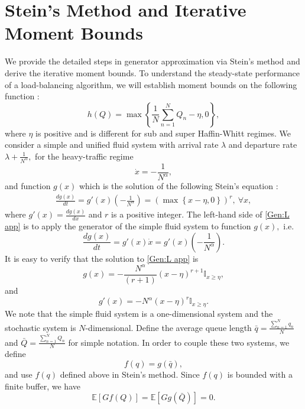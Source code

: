 \documentclass[11pt,oneside,letter]{article}
\begin{document}
\section{Stein's Method and Iterative Moment Bounds}\label{app:stein}
We provide the detailed steps in generator approximation via Stein's method and derive the iterative moment bounds. To understand the steady-state performance of a load-balancing algorithm, we will establish moment bounds on the following function \cite{LiuYin_20}:
$$h(Q) = \max\left\{\frac{1}{N}\sum_{n=1}^{N} Q_n- \eta,0\right\},$$
where $\eta$ is positive and is different for sub and super Haffin-Whitt regimes. We consider a simple and unified fluid system with arrival rate $\lambda$ and departure rate $\lambda+\frac{1}{N^{\alpha}},$ for the heavy-traffic regime 
$$\dot{x}=-\frac{1}{N^{\alpha}},$$ and function $g(x)$ which is the solution of the following Stein's equation \cite{Yin_16}:
\begin{align}
\frac{dg(x)}{dt} = g'(x) \left(-\frac{1}{N^{\alpha}}\right)  = \left(\max\left\{x-\eta,0\right\}\right)^r, \ \forall x, \label{Gen:L app}
\end{align} where {$g'(x) = \frac{d g(x)}{d x}$} and $r$ is a positive integer. The left-hand side of \eqref{Gen:L app} is to apply the generator of the simple fluid system to function $g(x),$ i.e. $$\frac{dg(x)}{dt}=g'(x)\dot{x}=g'(x) \left(-\frac{1}{N^{\alpha}}\right).$$
It is easy to verify that the solution to \eqref{Gen:L app} is
\begin{equation}g(x)=-\frac{N^{\alpha}}{(r+1)}\left(x-\eta\right)^{r+1} \mathbb{I}_{x\geq\eta},\label{eq:L}\end{equation} and
\begin{equation}g'(x)=-N^{\alpha}\left(x-\eta\right)^{r} \mathbb{I}_{x\geq\eta}.\label{eq:Lder}
\end{equation}
We note that the simple fluid system is a one-dimensional system and the stochastic system is $N$-dimensional. 
Define the average queue length $\bar q= \frac{\sum_{n=1}^Nq_n}{N}$ and $\bar Q= \frac{\sum_{n=1}^NQ_n}{N}$ for simple notation.  
In order to couple these two systems, we define
\begin{equation}
f(q)=g\left(\bar q\right),\label{eq:steinsolution}
\end{equation} and use $f(q)$ defined above in Stein's method. Since $f(q)$ is bounded with a finite buffer, we have 
\begin{equation}
\mathbb{E}[Gf(Q)]= \mathbb E\left[Gg\left(\bar Q\right)\right]=0.\label{eq:sse app}
        \end{equation}
\end{document}
